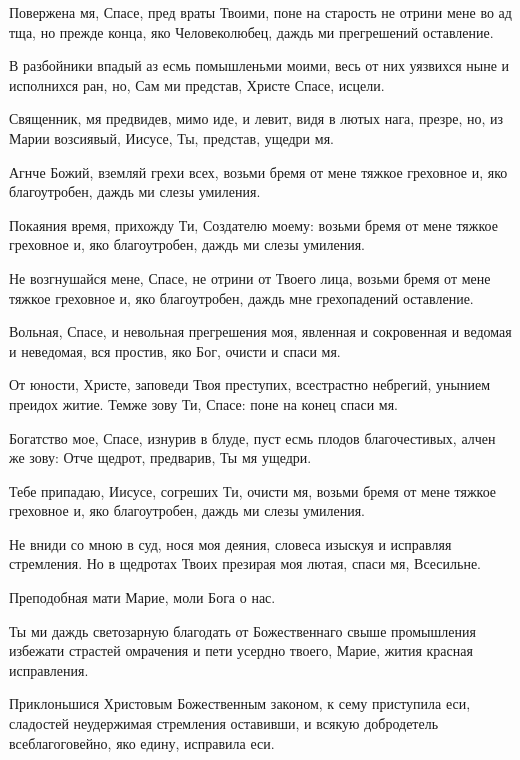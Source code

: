 Повержена мя, Спасе, пред враты Твоими, поне на старость не отрини мене во ад тща, но прежде конца, яко Человеколюбец, даждь ми прегрешений оставление.

В разбойники впадый аз есмь помышленьми моими, весь от них уязвихся ныне и исполнихся ран, но, Сам ми представ, Христе Спасе, исцели.

Священник, мя предвидев, мимо иде, и левит, видя в лютых нага, презре, но, из Марии возсиявый, Иисусе, Ты, представ, ущедри мя.

Агнче Божий, вземляй грехи всех, возьми бремя от мене тяжкое греховное и, яко благоутробен, даждь ми слезы умиления.

Покаяния время, прихожду Ти, Создателю моему: возьми бремя от мене тяжкое греховное и, яко благоутробен, даждь ми слезы умиления.

Не возгнушайся мене, Спасе, не отрини от Твоего лица, возьми бремя от мене тяжкое греховное и, яко благоутробен, даждь мне грехопадений оставление.

Вольная, Спасе, и невольная прегрешения моя, явленная и сокровенная и ведомая и неведомая, вся простив, яко Бог, очисти и спаси мя.

От юности, Христе, заповеди Твоя преступих, всестрастно небрегий, унынием преидох житие. Темже зову Ти, Спасе: поне на конец спаси мя.

Богатство мое, Спасе, изнурив в блуде, пуст есмь плодов благочестивых, алчен же зову: Отче щедрот, предварив, Ты мя ущедри.

Тебе припадаю, Иисусе, согреших Ти, очисти мя, возьми бремя от мене тяжкое греховное и, яко благоутробен, даждь ми слезы умиления.

Не вниди со мною в суд, нося моя деяния, словеса изыскуя и исправляя стремления. Но в щедротах Твоих презирая моя лютая, спаси мя, Всесильне.


Преподобная мати Марие, моли Бога о нас.

Ты ми даждь светозарную благодать от Божественнаго свыше промышления избежати страстей омрачения и пети усердно твоего, Марие, жития красная исправления.


Приклоньшися Христовым Божественным законом, к сему приступила еси, сладостей неудержимая стремления оставивши, и всякую добродетель всеблагоговейно, яко едину, исправила еси.

